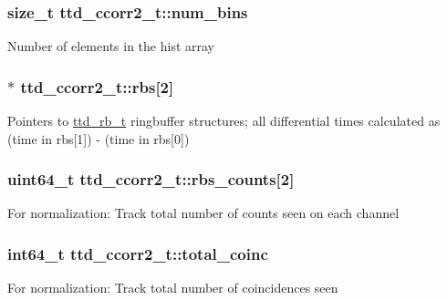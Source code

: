\subsubsection[{num\+\_\+bins}]{\setlength{\rightskip}{0pt plus 5cm}size\+\_\+t ttd\+\_\+ccorr2\+\_\+t\+::num\+\_\+bins}\label{structttd__ccorr2__t_a811a546cf1b2cf24a6c907c4917932ef}
Number of elements in the {\ttfamily hist} array \hypertarget{structttd__ccorr2__t_aa64b2c0039a6466a4d15e18e1d4e22cf}{}
\subsubsection[{rbs}]{$\ast$ ttd\+\_\+ccorr2\+\_\+t\+::rbs\mbox{[}2\mbox{]}}\label{structttd__ccorr2__t_aa64b2c0039a6466a4d15e18e1d4e22cf}
Pointers to \hyperlink{structttd__rb__t}{ttd\+\_\+rb\+\_\+t} ringbuffer structures; all differential times calculated as (time in rbs\mbox{[}1\mbox{]}) -\/ (time in rbs\mbox{[}0\mbox{]}) \hypertarget{structttd__ccorr2__t_a8413d9d1551e1fafbaf6d168ca997b0c}{}
\subsubsection[{rbs\+\_\+counts}]{\setlength{\rightskip}{0pt plus 5cm}uint64\+\_\+t ttd\+\_\+ccorr2\+\_\+t\+::rbs\+\_\+counts\mbox{[}2\mbox{]}}\label{structttd__ccorr2__t_a8413d9d1551e1fafbaf6d168ca997b0c}
For normalization\+: Track total number of counts seen on each channel \hypertarget{structttd__ccorr2__t_a127fca4b0a397dc24cf6c3165273ca97}{}
\subsubsection[{total\+\_\+coinc}]{\setlength{\rightskip}{0pt plus 5cm}int64\+\_\+t ttd\+\_\+ccorr2\+\_\+t\+::total\+\_\+coinc}\label{structttd__ccorr2__t_a127fca4b0a397dc24cf6c3165273ca97}
For normalization\+: Track total number of coincidences seen \hypertarget{structttd__ccorr2__t_a2afa4d3a622ea10c731181ecaefc63c3}{}
